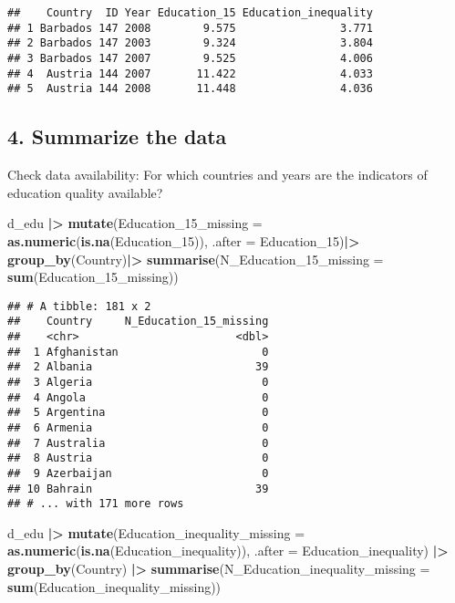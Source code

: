 \documentclass[
]{article}
\newenvironment{Shaded}{\begin{snugshade}}{\end{snugshade}}
\newcommand{\AttributeTok}[1]{\textcolor[rgb]{0.13,0.29,0.53}{#1}}
\newcommand{\FunctionTok}[1]{\textcolor[rgb]{0.13,0.29,0.53}{\textbf{#1}}}
\newcommand{\NormalTok}[1]{#1}
\newcommand{\SpecialCharTok}[1]{\textcolor[rgb]{0.81,0.36,0.00}{\textbf{#1}}}
\begin{document}
\begin{verbatim}
##    Country  ID Year Education_15 Education_inequality
## 1 Barbados 147 2008        9.575                3.771
## 2 Barbados 147 2003        9.324                3.804
## 3 Barbados 147 2007        9.525                4.006
## 4  Austria 144 2007       11.422                4.033
## 5  Austria 144 2008       11.448                4.036
\end{verbatim}

\hypertarget{summarize-the-data}{%
\subsection{4. Summarize the data}\label{summarize-the-data}}

Check data availability: For which countries and years are the
indicators of education quality available?

\begin{Shaded}
\begin{Highlighting}[]
\NormalTok{d\_edu }\SpecialCharTok{|\textgreater{}}
  \FunctionTok{mutate}\NormalTok{(}\AttributeTok{Education\_15\_missing =} \FunctionTok{as.numeric}\NormalTok{(}\FunctionTok{is.na}\NormalTok{(Education\_15)), }\AttributeTok{.after =}\NormalTok{ Education\_15)}\SpecialCharTok{|\textgreater{}}
  \FunctionTok{group\_by}\NormalTok{(Country)}\SpecialCharTok{|\textgreater{}}
  \FunctionTok{summarise}\NormalTok{(}\AttributeTok{N\_Education\_15\_missing =} \FunctionTok{sum}\NormalTok{(Education\_15\_missing))}
\end{Highlighting}
\end{Shaded}

\begin{verbatim}
## # A tibble: 181 x 2
##    Country     N_Education_15_missing
##    <chr>                        <dbl>
##  1 Afghanistan                      0
##  2 Albania                         39
##  3 Algeria                          0
##  4 Angola                           0
##  5 Argentina                        0
##  6 Armenia                          0
##  7 Australia                        0
##  8 Austria                          0
##  9 Azerbaijan                       0
## 10 Bahrain                         39
## # ... with 171 more rows
\end{verbatim}

\begin{Shaded}
\begin{Highlighting}[]
\NormalTok{d\_edu }\SpecialCharTok{|\textgreater{}}
  \FunctionTok{mutate}\NormalTok{(}\AttributeTok{Education\_inequality\_missing =} \FunctionTok{as.numeric}\NormalTok{(}\FunctionTok{is.na}\NormalTok{(Education\_inequality)), }\AttributeTok{.after =}\NormalTok{ Education\_inequality) }\SpecialCharTok{|\textgreater{}}
  \FunctionTok{group\_by}\NormalTok{(Country) }\SpecialCharTok{|\textgreater{}}
  \FunctionTok{summarise}\NormalTok{(}\AttributeTok{N\_Education\_inequality\_missing =} \FunctionTok{sum}\NormalTok{(Education\_inequality\_missing))}
\end{Highlighting}
\end{Shaded}
\end{document}
